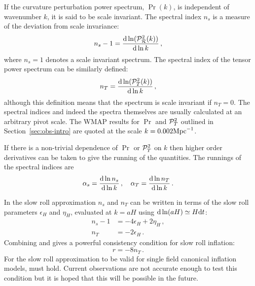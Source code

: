 If the curvature perturbation power spectrum, $\Pr(k)$, is independent of
wavenumber $k$, it is said to be scale invariant. The spectral index $n_s$ is a
measure of the deviation from scale invariance:
% 
\begin{equation}
\label{eq:nsdefn-intro}
 n_s -1 = \frac{\mathrm{d} \ln (\mathcal{P}_{\mathcal{R}}^2 (k))}{\mathrm{d} \ln k}\,,
\end{equation}
% 
where $n_s=1$ denotes a scale invariant spectrum. The spectral index of
the tensor power spectrum can be similarly defined:
% 
\begin{equation}
\label{eq:ntdefn-intro}
 n_T = \frac{\mathrm{d} \ln(\mathcal{P}_T^2(k))}{\mathrm{d} \ln k}\,,
\end{equation}
although this definition means that the spectrum is scale invariant if
$n_T=0$.
The spectral indices and indeed the spectra themselves are usually calculated
at an arbitrary pivot scale. The WMAP results for $\Pr$ and $\mathcal{P}_T^2$ outlined in
Section~\ref{sec:obs-intro} are quoted at the scale $k=0.002\mathrm{Mpc}^{-1}$.


If there is a non-trivial dependence of $\Pr$ or $\mathcal{P}_T^2$ on $k$ then higher order
derivatives can be taken to give the running of the quantities. The runnings
of the spectral indices are
% 
\begin{equation}
\label{eq:runningsdefn-intro}
 \alpha_s = \frac{\mathrm{d} \ln n_s}{\mathrm{d} \ln k}\,, \quad 
  \alpha_T = \frac{\mathrm{d} \ln n_T}{\mathrm{d} \ln k}\,.
\end{equation}

In the slow roll approximation $n_s$ and $n_T$ can be written in terms of the slow
roll parameters $\epsilon_H$ and $\eta_H$, evaluated at $k=aH$ using $\mathrm{d} \ln(aH)
\simeq H\mathrm{d} t$:
% 
\begin{align}
 n_s -1 &= -4\epsilon_H + 2\eta_H\,, \\
 n_T &= -2\epsilon_H \label{eq:ntslowroll-intro}\,.
\end{align}
% 
Combining  and  gives a
powerful consistency condition for slow roll inflation:
% 
\begin{equation}
 \label{eq:consistency-intro}
 r = -8 n_T \,.
\end{equation}
% 
For the slow roll approximation to be valid for single field canonical inflation
models,  must hold. Current observations are not accurate
enough to test this condition but it is hoped that this will be possible in the
future.


